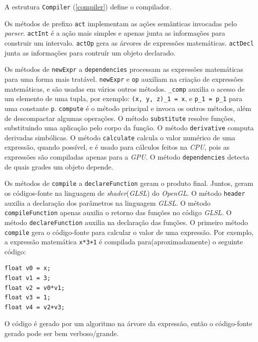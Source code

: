 \newpage
A estrutura \texttt{Compiler} (\ref{compiler}) define o compilador.

\lstset{language=c++}

Os métodos de prefixo \texttt{act} implementam as
ações semânticas invocadas pelo \textit{parser}.
\texttt{actInt} é a ação mais simples e apenas junta as informações
para construir um intervalo.
\texttt{actOp} gera as árvores de expressões matemáticas.
\texttt{actDecl} junta as informações para contruír um objeto declarado.

Os métodos de \texttt{newExpr} a \texttt{dependencies} processam
as expressões matemáticas para uma forma mais tratável.
\texttt{newExpr} e \texttt{op} auxiliam na criação de expressões matemáticas, e são usadas
em vários outros métodos.
\texttt{\_comp} auxilia o acesso de um elemento de uma tupla, por exemplo:
\texttt{(x, y, z)\_1 = x}, e \texttt{p\_1 = p\_1} para uma constante \texttt{p}.
\texttt{compute} é o método principal e invoca os outros métodos, além de
descompactar algumas operações.
O método \texttt{substitute} resolve funções, substituindo uma aplicação pelo corpo da função.
O método \texttt{derivative} computa derivadas simbólicas.
O método \texttt{calculate} calcula o valor numérico de uma expressão, 
quando possível, e é usado para cálculos feitos na \textit{CPU}, pois
as expressões são compiladas apenas para a \textit{GPU}.
O método \texttt{dependencies} detecta de quais grades um objeto depende.

Os métodos de \texttt{compile} a \texttt{declareFunction} geram o produto final.
Juntos, geram os códigos-fonte na linguagem de \textit{shader}(\textit{GLSL}) do \textit{OpenGL}.
O método \texttt{header} auxilia a declaração dos parâmetros na linguagem \textit{GLSL}.
O método \texttt{compileFunction} apenas auxilia o retorno das funções no código \textit{GLSL}.
O método \texttt{declareFunction} auxilia na declaração das funções.
O primeiro método \texttt{compile} gera o código-fonte para calcular o valor de uma
expressão.
Por exemplo, a expressão matemática \texttt{x*3+1} é
compilada para(aproximadamente) o seguinte código:

\begin{lstlisting}
float v0 = x;
float v1 = 3;
float v2 = v0*v1;
float v3 = 1;
float v4 = v2+v3;
\end{lstlisting}

O código é gerado por um algoritmo na árvore da expressão,
então o código-fonte gerado pode ser bem verboso/grande.

